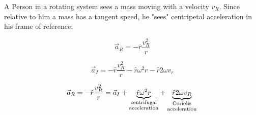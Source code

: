 A Person in a rotating system sees a mass moving with a velocity $v_R$. Since relative to him a mass has a tangent speed, he "sees" centripetal acceleration in his frame of reference:

$$\vec{a}_R = -\hat{r} \frac{v^2_R}{r}$$

$$\vec{a}_I = -\hat{r} \frac{v_R^2}{r} - \hat{r}\omega^2r-\hat{r}2\omega v_r $$


$$\vec{a}_R = -\hat{r} \frac{v^2_R}{r} = \vec{a}_I + \underbrace{\hat{r} \omega^2 r}_{\parbox{1.5cm}{\scriptsize  \centering  centrifugal \\ acceleration}} + \underbrace{\hat{r} 2 \omega v_R}_{\parbox{1.5cm}{\scriptsize  \centering  Coriolis \\ acceleration}}$$
